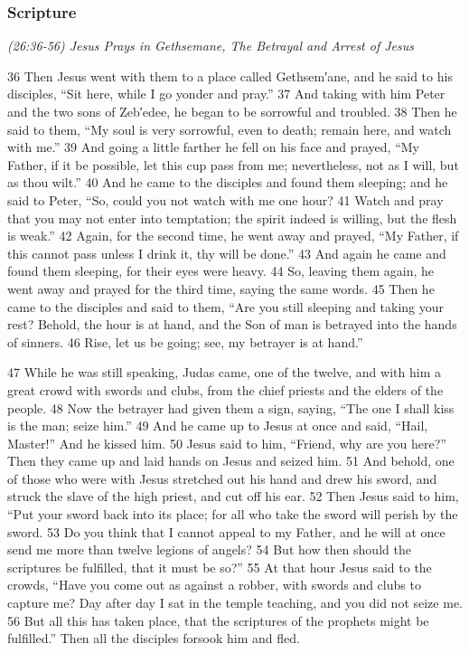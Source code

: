 \documentclass[letterpaper]{report}
\begin{document}
\subsubsection{Scripture}

{\centering
	\emph{(26:36-56) Jesus Prays in Gethsemane, The Betrayal and Arrest of Jesus}\\
}
\begin{multicols}{2}
36 Then Jesus went with them to a place called Gethsem′ane, and he said to his disciples, “Sit here, while I go yonder and pray.” 37 And taking with him Peter and the two sons of Zeb′edee, he began to be sorrowful and troubled. 38 Then he said to them, “My soul is very sorrowful, even to death; remain here, and watch with me.” 39 And going a little farther he fell on his face and prayed, “My Father, if it be possible, let this cup pass from me; nevertheless, not as I will, but as thou wilt.” 40 And he came to the disciples and found them sleeping; and he said to Peter, “So, could you not watch with me one hour? 41 Watch and pray that you may not enter into temptation; the spirit indeed is willing, but the flesh is weak.” 42 Again, for the second time, he went away and prayed, “My Father, if this cannot pass unless I drink it, thy will be done.” 43 And again he came and found them sleeping, for their eyes were heavy. 44 So, leaving them again, he went away and prayed for the third time, saying the same words. 45 Then he came to the disciples and said to them, “Are you still sleeping and taking your rest? Behold, the hour is at hand, and the Son of man is betrayed into the hands of sinners. 46 Rise, let us be going; see, my betrayer is at hand.”

47 While he was still speaking, Judas came, one of the twelve, and with him a great crowd with swords and clubs, from the chief priests and the elders of the people. 48 Now the betrayer had given them a sign, saying, “The one I shall kiss is the man; seize him.” 49 And he came up to Jesus at once and said, “Hail, Master!” And he kissed him. 50 Jesus said to him, “Friend, why are you here?” Then they came up and laid hands on Jesus and seized him. 51 And behold, one of those who were with Jesus stretched out his hand and drew his sword, and struck the slave of the high priest, and cut off his ear. 52 Then Jesus said to him, “Put your sword back into its place; for all who take the sword will perish by the sword. 53 Do you think that I cannot appeal to my Father, and he will at once send me more than twelve legions of angels? 54 But how then should the scriptures be fulfilled, that it must be so?” 55 At that hour Jesus said to the crowds, “Have you come out as against a robber, with swords and clubs to capture me? Day after day I sat in the temple teaching, and you did not seize me. 56 But all this has taken place, that the scriptures of the prophets might be fulfilled.” Then all the disciples forsook him and fled.
\end{multicols}
\end{document}

